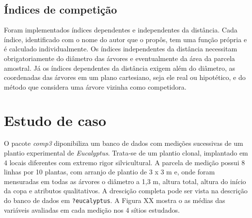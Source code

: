 \documentclass[article]{jss}
\begin{document}
\subsection{Índices de competição}\label{indices-de-competicao}

Foram implementados índices dependentes e independentes da distância.
Cada índice, identificado com o nome do autor que o propôs, tem uma
função própria e é calculado individualmente. Os índices independentes
da distância necessitam obrigatoriamente do diâmetro das árvores e
eventualmente da área da parcela amostral. Já os índices dependentes da
distância exigem além do diâmetro, as coordenadas das árvores em um
plano cartesiano, seja ele real ou hipotético, e do método que considera
uma árvore vizinha como competidora.

\section{Estudo de caso}\label{estudo-de-caso}

O pacote \emph{comp3} diponibiliza um banco de dados com medições
sucessivas de um plantio experimental de \emph{Eucalyptus}. Trata-se de
um plantio clonal, implantado em 4 locais diferentes com extremo rigor
silvicultural. A parcela de medição possui 8 linhas por 10 plantas, com
arranjo de plantio de 3 x 3 m e, onde foram mensuradas em todas as
árvores o diâmetro a 1,3 m, altura total, altura do início da copa e
atributos qualitativos. A drescição completa pode ser vista na descrição
do banco de dados em \texttt{?eucalyptus}. A Figura XX mostra o as
médias das variáveis avaliadas em cada medição nos 4 sítios estudados.
\end{document}
